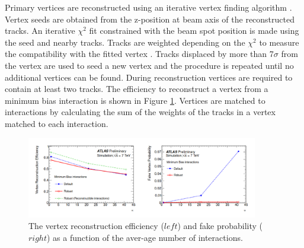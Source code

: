 Primary vertices are reconstructed using an iterative vertex finding algorithm \cite{Vrtx_Eff}. Vertex seeds are obtained from the z-position at beam axis of the reconstructed tracks. An iterative $\chi^2$ fit constrained with the beam spot position is made using the seed and nearby tracks. Tracks are weighted depending on the $\chi^2$ to measure the compatibility with the fitted vertex \cite{chi2}. Tracks displaced by more than 7$\sigma$ from the vertex are used to seed a new vertex and the procedure is repeated until no additional vertices can be found. During reconstruction vertices are required to contain at least two tracks. The efficiency to reconstruct a vertex from a minimum bias interaction is shown in Figure \ref{fig:chap2:Objects:Vtx:Eff}. Vertices  are matched to interactions by calculating the sum of the weights of the tracks in a vertex matched to each interaction. 
\begin{figure}[ht]
    \centering
    \includegraphics[width=0.9\textwidth]{Ch2/Img/Vtx_Reco_Eff.png}
    \caption{The vertex reconstruction efficiency ($left$) and fake probability ($right$) as a function of the aver-age number of interactions.}
    \label{fig:chap2:Objects:Vtx:Eff}
\end{figure}

